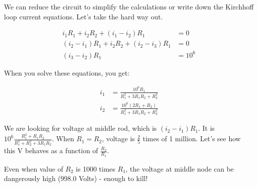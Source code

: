 \documentclass[a4paper,10pt]{article}
\begin{document}
We can reduce the circuit to simplify the calculations or write down the
Kirchhoff loop current equations. Let's take the hard way out.

\begin{align}
    i_1 R_1 + i_2 R_2 + (i_1 - i_2) R_1 &= 0  \\
    (i_2 - i_1) R_1 + i_2 R_2 + (i_2 - i_3) R_1 &= 0  \\
    ( i_3 - i_2) R_1 &= 10^6
\end{align}

When you solve these equations, you get:

\begin{align}
    i_1 &= \frac{10^6 R_1}{R_1^2 + 3R_1R_2 + R_2^2} \\
    i_2 &= \frac{10^6 (2R_1 + R_2)}{R_1^2 + 3R_1R_2+R_2^2} 
\end{align}

We are looking for voltage at middle rod, which is $(i_2 - i_1)R_1$. It is 
$10^6 \frac{R_1^2 + R_1R_2}{R_1^2 + R_2^2 + 3R_1R_2}$. When $R_1 = R_2$, voltage is $\frac{2}{5}$
times of 1 million. Let's see how this V behaves as a function of
$\frac{R_2}{R_1}$.


Even when value of $R_2$ is 1000 times $R_1$, the voltage at middle node can be
dangerously high (998.0 Volts) - enough to kill!
\end{document}
